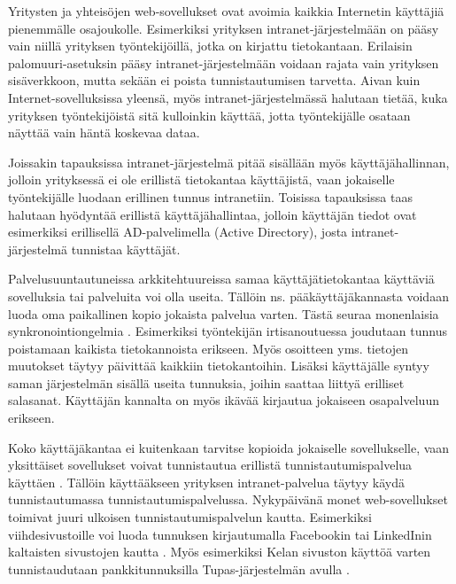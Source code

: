 Yritysten ja yhteisöjen web-sovellukset ovat avoimia kaikkia Internetin käyttäjiä pienemmälle osajoukolle. Esimerkiksi yrityksen intranet-järjestelmään on pääsy vain niillä yrityksen työntekijöillä, jotka on kirjattu tietokantaan. Erilaisin palomuuri-asetuksin pääsy intranet-järjestelmään voidaan rajata vain yrityksen sisäverkkoon, mutta sekään ei poista tunnistautumisen tarvetta. Aivan kuin Internet-sovelluksissa yleensä, myös intranet-järjestelmässä halutaan tietää, kuka yrityksen työntekijöistä sitä kulloinkin käyttää, jotta työntekijälle osataan näyttää vain häntä koskevaa dataa.

Joissakin tapauksissa intranet-järjestelmä pitää sisällään myös käyttäjähallinnan, jolloin yrityksessä ei ole erillistä tietokantaa käyttäjistä, vaan jokaiselle työntekijälle luodaan erillinen tunnus intranetiin. Toisissa tapauksissa taas halutaan hyödyntää erillistä käyttäjähallintaa, jolloin käyttäjän tiedot ovat esimerkiksi erillisellä AD-palvelimella (Active Directory), josta intranet-järjestelmä tunnistaa käyttäjät.

Palvelusuuntautuneissa arkkitehtuureissa samaa käyttäjätietokantaa käyttäviä sovelluksia tai palveluita voi olla useita. Tällöin ns. pääkäyttäjäkannasta voidaan luoda oma paikallinen kopio jokaista palvelua varten. Tästä seuraa monenlaisia synkronointiongelmia \cite{synkronointi}. Esimerkiksi työntekijän irtisanoutuessa joudutaan tunnus poistamaan kaikista tietokannoista erikseen. Myös osoitteen yms. tietojen muutokset täytyy päivittää kaikkiin tietokantoihin. Lisäksi käyttäjälle syntyy saman järjestelmän sisällä useita tunnuksia, joihin saattaa liittyä erilliset salasanat. Käyttäjän kannalta on myös ikävää kirjautua jokaiseen osapalveluun erikseen.

Koko käyttäjäkantaa ei kuitenkaan tarvitse kopioida jokaiselle sovellukselle, vaan yksittäiset sovellukset voivat tunnistautua erillistä tunnistautumispalvelua käyttäen \cite{facebook}. Tällöin käyttääkseen yrityksen intranet-palvelua täytyy käydä tunnistautumassa tunnistautumispalvelussa. Nykypäivänä monet web-sovellukset toimivat juuri ulkoisen tunnistautumispalvelun kautta. Esimerkiksi viihdesivustoille voi luoda tunnuksen kirjautumalla Facebookin tai LinkedInin kaltaisten sivustojen kautta \cite{facebook}. Myös esimerkiksi Kelan sivuston käyttöä varten tunnistaudutaan pankkitunnuksilla Tupas-järjestelmän avulla \cite{tupas}.